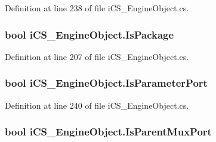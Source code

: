 Definition at line 238 of file i\+C\+S\+\_\+\+Engine\+Object.\+cs.

\hypertarget{classi_c_s___engine_object_ac1f7bbce00a3392ffe30cda5377e3d77}{
\subsubsection[{Is\+Package}]{\setlength{\rightskip}{0pt plus 5cm}bool i\+C\+S\+\_\+\+Engine\+Object.\+Is\+Package\hspace{0.3cm}{\ttfamily [get]}}}\label{classi_c_s___engine_object_ac1f7bbce00a3392ffe30cda5377e3d77}


Definition at line 207 of file i\+C\+S\+\_\+\+Engine\+Object.\+cs.

\hypertarget{classi_c_s___engine_object_a4cf258cd2b60cf5f6d72cded067e68e9}{
\subsubsection[{Is\+Parameter\+Port}]{\setlength{\rightskip}{0pt plus 5cm}bool i\+C\+S\+\_\+\+Engine\+Object.\+Is\+Parameter\+Port\hspace{0.3cm}{\ttfamily [get]}}}\label{classi_c_s___engine_object_a4cf258cd2b60cf5f6d72cded067e68e9}


Definition at line 240 of file i\+C\+S\+\_\+\+Engine\+Object.\+cs.

\hypertarget{classi_c_s___engine_object_a230c82e466ea22b656c53d11bbf798eb}{
\subsubsection[{Is\+Parent\+Mux\+Port}]{\setlength{\rightskip}{0pt plus 5cm}bool i\+C\+S\+\_\+\+Engine\+Object.\+Is\+Parent\+Mux\+Port\hspace{0.3cm}{\ttfamily [get]}}}\label{classi_c_s___engine_object_a230c82e466ea22b656c53d11bbf798eb}


